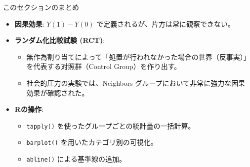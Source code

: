 \documentclass[
  ignorenonframetext,
]{beamer}
\providecommand{\tightlist}{%
  \setlength{\itemsep}{0pt}\setlength{\parskip}{0pt}}
\begin{document}
\begin{frame}[fragile]{このセクションのまとめ}
\protect\hypertarget{ux3053ux306eux30bbux30afux30b7ux30e7ux30f3ux306eux307eux3068ux3081}{}
\begin{itemize}
\tightlist
\item
  \textbf{因果効果}: \(Y(1) - Y(0)\)
  で定義されるが、片方は常に観察できない。
\item
  \textbf{ランダム化比較試験 (RCT)}:

  \begin{itemize}
  \tightlist
  \item
    無作為割り当てによって「処置が行われなかった場合の世界（反事実）」を代表する対照群（Control
    Group）を作り出す。
  \item
    社会的圧力の実験では、Neighbors
    グループにおいて非常に強力な因果効果が確認された。
  \end{itemize}
\item
  \textbf{Rの操作}:

  \begin{itemize}
  \tightlist
  \item
    \texttt{tapply()} を使ったグループごとの統計量の一括計算。
  \item
    \texttt{barplot()} を用いたカテゴリ別の可視化。
  \item
    \texttt{abline()} による基準線の追加。
  \end{itemize}
\end{itemize}
\end{frame}
\end{document}
